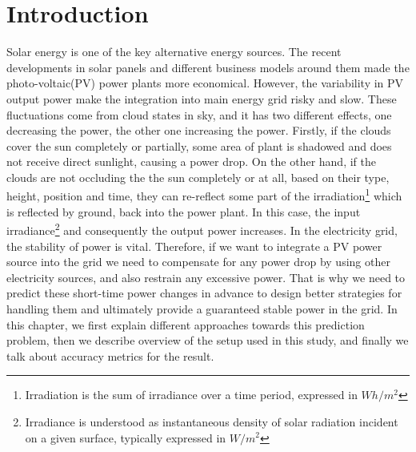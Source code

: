 \newcommand{\package}{\emph}
\chapter{Introduction}
Solar energy is one of the key alternative energy sources. The recent developments in solar panels and different business models around them made the photo-voltaic(PV) power plants more economical. However, the variability in PV output power make the integration into main energy grid risky and slow\cite{solar_variable}. These fluctuations come from cloud states in sky, and it has two different effects, one decreasing the power, the other one increasing the power. Firstly, if the clouds cover the sun completely or partially, some area of plant is shadowed and does not receive direct sunlight, causing a power drop. On the other hand, if the clouds are not occluding the the sun completely or at all, based on their type, height, position and time, they can re-reflect some part of the irradiation\footnote{Irradiation is the sum of irradiance over a time period, expressed in $Wh/m^2$} which is reflected by ground, back into the power plant. In this case, the input irradiance\footnote{Irradiance is understood as instantaneous density of solar radiation incident on a given surface, typically expressed in $W/m^2$} and consequently the output power increases. In the electricity grid, the stability of power is vital. Therefore, if we want to integrate a PV power source into the grid we need to compensate for any power drop by using other electricity sources, and also restrain any excessive power. That is why we need to predict these short-time power changes in advance to design better strategies for handling them and ultimately provide a guaranteed stable power in the grid. In this chapter, we first explain different approaches towards this prediction problem, then we describe overview of the setup used in this study, and finally we talk about accuracy metrics for the result. 


